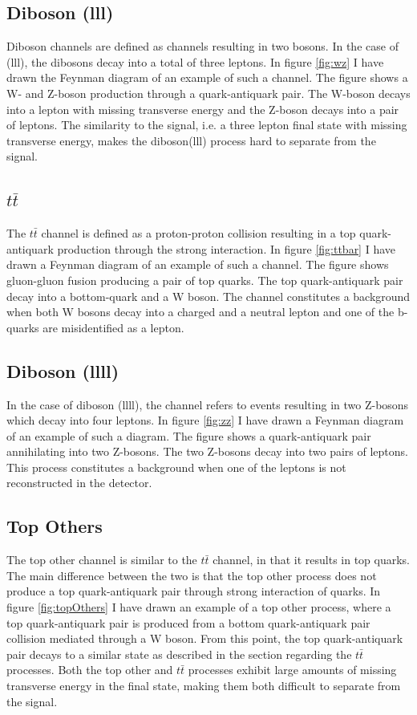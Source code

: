 \subsection*{Diboson (lll)}
Diboson channels are defined as channels resulting in two bosons. In the case of (lll), the dibosons
decay into a total of three leptons. In figure \ref{fig:wz} I have drawn the Feynman diagram of an 
example of such a channel. The figure shows a W- and Z-boson production through a quark-antiquark pair.
The W-boson decays into a lepton with missing transverse energy and the Z-boson decays into a pair of leptons.
The similarity to the signal, i.e. a three lepton final state with missing transverse energy, makes the diboson(lll)
process hard to separate from the signal.  

\subsection*{$t\bar{t}$}\label{subsec:ttbar}
The $t\bar{t}$ channel is defined as a proton-proton collision resulting in a top quark-antiquark production 
through the strong interaction. In figure \ref{fig:ttbar} I have drawn a Feynman diagram of an example of such 
a channel. The figure shows gluon-gluon fusion producing a pair of top quarks. The top quark-antiquark pair decay into 
a bottom-quark and a W boson. The channel constitutes a background when both W bosons decay into a charged and a 
neutral lepton and one of the b-quarks are misidentified as a lepton. 

\subsection*{Diboson (llll)}
In the case of diboson (llll), the channel refers to events resulting in two Z-bosons which decay 
into four leptons. In figure \ref{fig:zz} I have drawn a Feynman diagram of an example of 
such a diagram. The figure shows a quark-antiquark pair annihilating into two Z-bosons.
The two Z-bosons decay into two pairs of leptons. This process constitutes a background when one 
of the leptons is not reconstructed in the detector.

\subsection*{Top Others}
The top other channel is similar to the $t\bar{t}$ channel, in that it results in top quarks. The main difference between 
the two is that the top other process does not produce a top quark-antiquark pair through strong interaction of quarks. 
In figure \ref{fig:topOthers} I have drawn an example of a top other process, where a top quark-antiquark pair is produced 
from a bottom quark-antiquark pair collision mediated through a W boson. From this point, the top quark-antiquark pair decays 
to a similar state as described in the section regarding the $t\bar{t}$ processes. Both the top other and $t\bar{t}$ processes exhibit
large amounts of missing transverse energy in the final state, making them both difficult to separate from the signal. 

